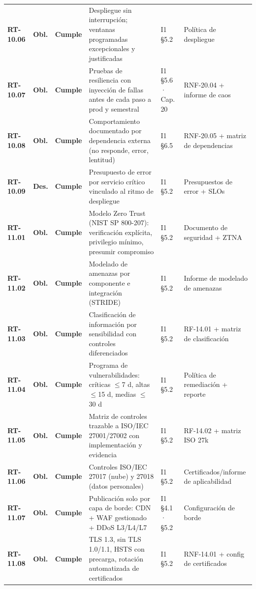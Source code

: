 \begin{small}
\begin{longtable}{@{}p{1.35cm} p{1.15cm} p{1.15cm} p{4.6cm} p{2.35cm} p{3.8cm}@{}}
\textbf{RT-10.06} & \textbf{Obl.} & \textbf{Cumple} & Despliegue sin interrupci\'on; ventanas programadas excepcionales y justificadas & I1 §5.2 & Pol\'itica de despliegue \\
\textbf{RT-10.07} & \textbf{Obl.} & \textbf{Cumple} & Pruebas de resiliencia con inyecci\'on de fallas antes de cada paso a prod y semestral & I1 §5.6 · Cap. 20 & RNF-20.04 + informe de caos \\
\textbf{RT-10.08} & \textbf{Obl.} & \textbf{Cumple} & Comportamiento documentado por dependencia externa (no responde, error, lentitud) & I1 §6.5 & RNF-20.05 + matriz de dependencias \\
\textbf{RT-10.09} & \textbf{Des.} & \textbf{Cumple} & Presupuesto de error por servicio cr\'itico vinculado al ritmo de despliegue & I1 §5.2 & Presupuestos de error + SLOs \\
\textbf{RT-11.01} & \textbf{Obl.} & \textbf{Cumple} & Modelo Zero Trust (NIST SP 800-207): verificaci\'on expl\'icita, privilegio m\'inimo, presumir compromiso & I1 §5.2 & Documento de seguridad + ZTNA \\
\textbf{RT-11.02} & \textbf{Obl.} & \textbf{Cumple} & Modelado de amenazas por componente e integraci\'on (STRIDE) & I1 §5.2 & Informe de modelado de amenazas \\
\textbf{RT-11.03} & \textbf{Obl.} & \textbf{Cumple} & Clasificaci\'on de informaci\'on por sensibilidad con controles diferenciados & I1 §5.2 & RF-14.01 + matriz de clasificaci\'on \\
\textbf{RT-11.04} & \textbf{Obl.} & \textbf{Cumple} & Programa de vulnerabilidades: cr\'iticas $\leq$7 d, altas $\leq$15 d, medias $\leq$30 d & I1 §5.2 & Pol\'itica de remediaci\'on + reporte \\
\textbf{RT-11.05} & \textbf{Obl.} & \textbf{Cumple} & Matriz de controles trazable a ISO/IEC 27001/27002 con implementaci\'on y evidencia & I1 §5.2 & RF-14.02 + matriz ISO 27k \\
\textbf{RT-11.06} & \textbf{Obl.} & \textbf{Cumple} & Controles ISO/IEC 27017 (nube) y 27018 (datos personales) & I1 §5.2 & Certificados/informe de aplicabilidad \\
\textbf{RT-11.07} & \textbf{Obl.} & \textbf{Cumple} & Publicaci\'on solo por capa de borde: CDN + WAF gestionado + DDoS L3/L4/L7 & I1 §4.1 · §5.2 & Configuraci\'on de borde \\
\textbf{RT-11.08} & \textbf{Obl.} & \textbf{Cumple} & TLS 1.3, sin TLS 1.0/1.1, HSTS con precarga, rotaci\'on automatizada de certificados & I1 §5.2 & RNF-14.01 + config de certificados \\

\end{longtable}
\end{small}
